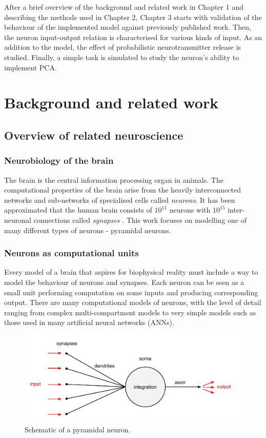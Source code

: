 \documentclass[a4paper,12pt]{report}
\theoremstyle{definition}
\begin{document}
After a brief overview of the background and related work in Chapter 1 and describing the methods used in Chapter 2, Chapter 3 starts with validation of the behaviour of the implemented model against previously published work. Then, the neuron input-output relation is characterised for various kinds of input. As an addition to the model, the effect of probabilistic neurotransmitter release is studied. Finally, a simple task is simulated to study the neuron's ability to implement PCA.



\chapter{Background and related work}


\section{Overview of related neuroscience} %

\subsection{Neurobiology of the brain} %
The brain is the central information processing organ in animals. The computational properties of the brain arise from the heavily interconnected networks and sub-networks of specialised cells called \emph{neurons}. It has been approximated that the human brain consists of $10^{11}$ neurons with $10^{15}$ inter-neuronal connections called \emph{synapses} \cite{herculano2009human}. This work focuses on modelling one of many different types of neurons - pyramidal neurons.


\subsection{Neurons as computational units}
Every model of a brain that aspires for biophysical reality must include a way to model the behaviour of neurons and synapses. Each neuron can be seen as a small unit performing computation on some inputs and producing corresponding output. There are many computational models of neurons, with the level of detail ranging from complex multi-compartment models to very simple models such as those used in many artificial neural networks (ANNs). 

\begin{figure}[h]
    \includegraphics[width=\textwidth]{figures/fig1.pdf}
    \caption{Schematic of a pyramidal neuron.}
    \label{fig:pyramidal}
\end{figure}
\end{document}
